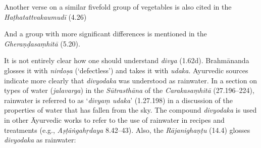 \begin{ekdosis}
\begin{philcomm}[hp01_062]
\begin{quote}
\begin{versinnote}
\end{versinnote}
\end{quote}
Another verse on a similar fivefold group of vegetables is also cited in the \emph{Haṭhatattvakaumudī} (4.26)
\begin{quote}
\begin{versinnote}
\end{versinnote}
\end{quote}
And a group with more significant differences is mentioned in the \emph{Gheraṇḍasaṃhitā} (5.20).
\begin{quote}
\begin{versinnote}
\end{versinnote}
\end{quote}

It is not entirely clear how one should understand \emph{divya} (1.62d). Brahmānanda glosses it with \emph{nirdoṣa} (`defectless') and takes it with \emph{udaka}. Ayurvedic sources indicate more clearly that \emph{divyodaka} was understood as rainwater. In a section on types of water (\emph{jalavarga}) in the \emph{Sūtrasthāna} of the \emph{Carakasaṃhitā} (27.196–224), rainwater is referred to as `\emph{divyaṃ udaka}' (1.27.198) in a discussion of the properties of water that has fallen from the sky. The compound \emph{divyodaka} is used in other Āyurvedic works to refer to the use of rainwater in recipes and treatments  (e.g., \emph{Aṣṭāṅgahṛdaya} 8.42–43). Also, the \emph{Rājanighaṇṭu} (14.4) glosses \emph{divyodaka} as rainwater:
\begin{quote}
\begin{versinnote}
\end{versinnote}
\end{quote}
%
%
\end{philcomm}


\end{ekdosis}

